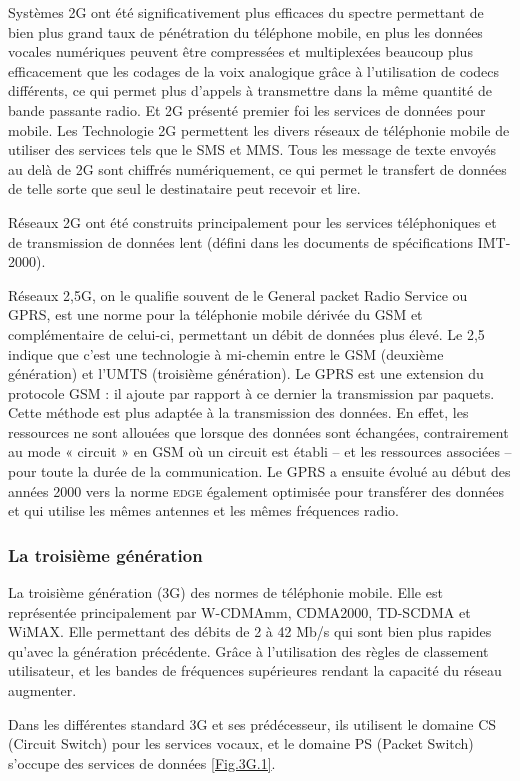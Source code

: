 Systèmes 2G ont été significativement plus efficaces du spectre permettant de bien plus grand taux de pénétration du téléphone mobile, en plus les données vocales numériques peuvent être compressées et multiplexées beaucoup plus efficacement que les codages de la voix analogique grâce à l'utilisation de codecs différents, ce qui permet plus d'appels à transmettre dans la même quantité de bande passante radio. Et 2G présenté premier foi les services de données pour mobile. Les Technologie 2G permettent les divers réseaux de téléphonie mobile de utiliser des services tels que le SMS et MMS. Tous les message de texte envoyés au delà de 2G sont chiffrés numériquement, ce qui permet le transfert de données de telle sorte que seul le destinataire peut recevoir et lire.   

Réseaux 2G ont été construits principalement pour les services téléphoniques et de transmission de données lent (défini dans les documents de spécifications IMT-2000).

Réseaux \textsf{2,5G}, on le qualifie souvent de le General packet Radio Service ou GPRS, est une norme pour la téléphonie mobile dérivée du GSM et complémentaire de celui-ci, permettant un débit de données plus élevé. Le 2,5 indique que c'est une technologie à mi-chemin entre le GSM (deuxième génération) et l'UMTS (troisième génération). Le GPRS est une extension du protocole GSM : il ajoute par rapport à ce dernier la transmission par paquets. Cette méthode est plus adaptée à la transmission des données. En effet, les ressources ne sont allouées que lorsque des données sont échangées, contrairement au mode « circuit » en GSM où un circuit est établi – et les ressources associées – pour toute la durée de la communication. Le GPRS a ensuite évolué au début des années 2000 vers la norme \textsc{edge} également optimisée pour transférer des données et qui utilise les mêmes antennes et les mêmes fréquences radio.
\subsubsection{La troisième génération}
La troisième génération (3G) des normes de téléphonie mobile. Elle est représentée principalement par W-CDMAmm, CDMA2000, TD-SCDMA et WiMAX. Elle permettant des débits de 2 à 42 Mb/s qui sont bien plus rapides qu'avec la génération précédente. Grâce à l'utilisation des règles de classement utilisateur, et les  bandes de fréquences supérieures rendant la capacité du réseau augmenter.

Dans les différentes standard  3G et ses prédécesseur, ils utilisent le domaine CS (Circuit Switch)  pour les services vocaux, et le domaine PS (Packet Switch) s'occupe des services de données \ref{Fig.3G.1}.
